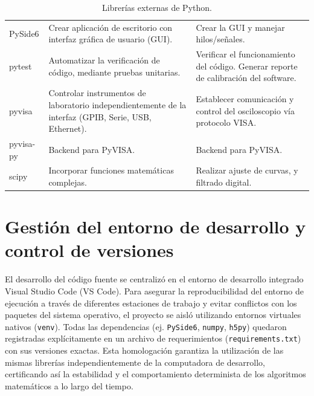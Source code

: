 \begin{table}[H]
\begin{tabularx}{\textwidth}{lXX}
        PySide6    & Crear aplicación de escritorio con interfaz gráfica de usuario (GUI).                                 & Crear la GUI y manejar hilos/señales.                                                \\ \addlinespace
        pytest     & Automatizar la verificación de código, mediante pruebas unitarias.                                    & Verificar el funcionamiento del código. Generar reporte de calibración del software. \\ \addlinespace
        pyvisa     & Controlar instrumentos de laboratorio independientemente de la interfaz (GPIB, Serie, USB, Ethernet). & Establecer comunicación y control del osciloscopio vía protocolo VISA.               \\ \addlinespace
        pyvisa-py  & Backend para PyVISA.                                                                                  & Backend para PyVISA.                                                                 \\ \addlinespace
        scipy      & Incorporar funciones matemáticas complejas.                                                           & Realizar ajuste de curvas, y filtrado digital.                                       \\ \bottomrule
    \end{tabularx}
    \caption{Librerías externas de Python.}
    \label{Tab:LibreriasExternas}
\end{table}

\section{Gestión del entorno de desarrollo y control de versiones}

El desarrollo del código fuente se centralizó en el entorno de desarrollo integrado Visual Studio Code (VS Code). Para asegurar la reproducibilidad del entorno de ejecución a través de diferentes estaciones de trabajo y evitar conflictos con los paquetes del sistema operativo, el proyecto se aisló utilizando entornos virtuales nativos (\texttt{venv}). Todas las dependencias (ej. \texttt{PySide6}, \texttt{numpy}, \texttt{h5py}) quedaron registradas explícitamente en un archivo de requerimientos (\texttt{requirements.txt}) con sus versiones exactas. Esta homologación garantiza la utilización de las mismas librerías independientemente de la computadora de desarrollo, certificando así la estabilidad y el comportamiento determinista de los algoritmos matemáticos a lo largo del tiempo.\par

